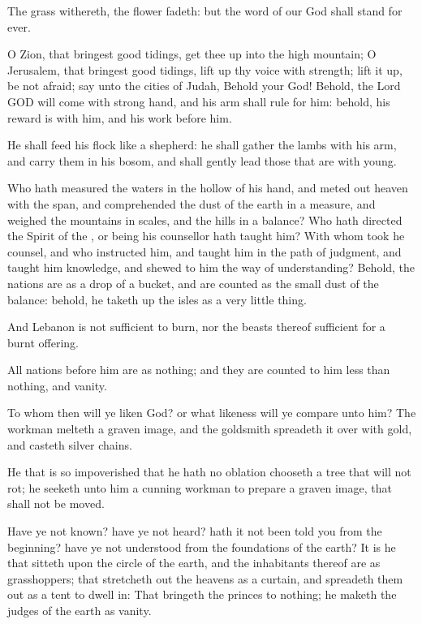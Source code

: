 \verse The grass withereth, the flower fadeth: but the word of our God shall stand for ever.

\verse O Zion, that bringest good tidings, get thee up into the high mountain; O Jerusalem, that bringest good tidings, lift up thy voice with strength; lift it up, be not afraid; say unto the cities of Judah, Behold your God!  \verse Behold, the Lord GOD will come with strong hand, and his arm shall rule for him: behold, his reward is with him, and his work before him.

\verse He shall feed his flock like a shepherd: he shall gather the lambs with his arm, and carry them in his bosom, and shall gently lead those that are with young.

\verse Who hath measured the waters in the hollow of his hand, and meted out heaven with the span, and comprehended the dust of the earth in a measure, and weighed the mountains in scales, and the hills in a balance?  \verse Who hath directed the Spirit of the \LORD, or being his counsellor hath taught him?  \verse With whom took he counsel, and who instructed him, and taught him in the path of judgment, and taught him knowledge, and shewed to him the way of understanding?  \verse Behold, the nations are as a drop of a bucket, and are counted as the small dust of the balance: behold, he taketh up the isles as a very little thing.

\verse And Lebanon is not sufficient to burn, nor the beasts thereof sufficient for a burnt offering.

\verse All nations before him are as nothing; and they are counted to him less than nothing, and vanity.

\verse To whom then will ye liken God? or what likeness will ye compare unto him?  \verse The workman melteth a graven image, and the goldsmith spreadeth it over with gold, and casteth silver chains.

\verse He that is so impoverished that he hath no oblation chooseth a tree that will not rot; he seeketh unto him a cunning workman to prepare a graven image, that shall not be moved.

\verse Have ye not known? have ye not heard? hath it not been told you from the beginning? have ye not understood from the foundations of the earth?  \verse It is he that sitteth upon the circle of the earth, and the inhabitants thereof are as grasshoppers; that stretcheth out the heavens as a curtain, and spreadeth them out as a tent to dwell in: \verse That bringeth the princes to nothing; he maketh the judges of the earth as vanity.

